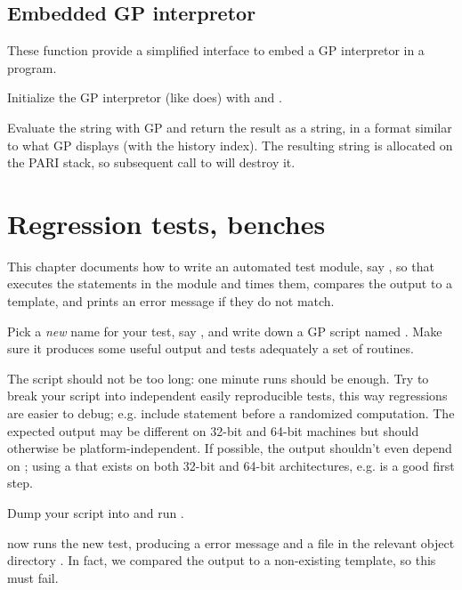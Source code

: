 \section{Embedded GP interpretor}
These function provide a simplified interface to embed a GP
interpretor in a program.

Initialize the GP interpretor (like  does) with
  and .

Evaluate the string  with GP and return the result as a string,
in a format similar to what GP displays (with the history index).
The resulting string is allocated on the PARI stack, so subsequent call
to  will destroy it.

\chapter{Regression tests, benches}

This chapter documents how to write an automated test module, say ,
so that  executes the statements in the  module
and times them, compares the output to a template, and prints an error
message if they do not match.

\item Pick a \emph{new} name for your test, say , and write down a
GP script named . Make sure it produces some useful output and tests
adequately a set of routines.

\item The script should not be too long: one minute runs should be enough.
Try to break your script into independent easily reproducible tests, this way
regressions are easier to debug; e.g. include  statement before
a randomized computation. The expected output may be different on 32-bit and
64-bit machines but should otherwise be platform-independent. If possible, the
output shouldn't even depend on ; using a 
that exists on both 32-bit and 64-bit architectures, e.g.  is a
good first step.

\item Dump your script into  and run .

\item {} now runs the new test, producing a \kbd{[BUG]} error
message and a  file in the relevant object directory .
In fact, we compared the output to a non-existing template, so this must fail.

